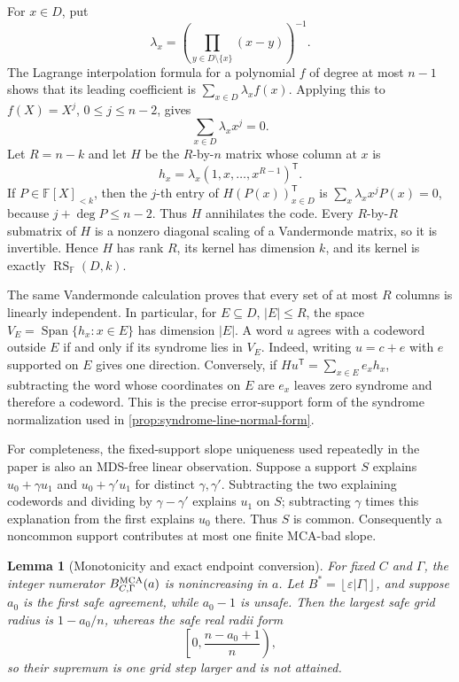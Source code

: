 \documentclass[11pt,a4paper]{amsart}
\numberwithin{equation}{section}
\newtheorem{lemma}[lemma]{Lemma}
\theoremstyle{remark}
\DeclareMathOperator{\RS}{RS}
\DeclareMathOperator{\Span}{Span}
\newcommand{\F}{\mathbb F}
\newcommand{\eps}{\varepsilon}
\newcommand{\floor}[1]{\left\lfloor #1\right\rfloor}
\begin{document}
For \(x\in D\), put
\[
 \lambda_x=\left(\prod_{y\in D\setminus\{x\}}(x-y)\right)^{-1}.
\]
The Lagrange interpolation formula for a polynomial \(f\) of degree at
most \(n-1\) shows that its leading coefficient is
\(\sum_{x\in D}\lambda_x f(x)\).  Applying this to
\(f(X)=X^j\), \(0\le j\le n-2\), gives
\[
                         \sum_{x\in D}\lambda_xx^j=0.
\]
Let \(R=n-k\) and let \(H\) be the \(R\)-by-\(n\) matrix whose column at
\(x\) is
\[
                    h_x=\lambda_x(1,x,\ldots,x^{R-1})^{\mathsf T}.
\]
If \(P\in\F[X]_{<k}\), then the \(j\)-th entry of
\(H(P(x))_{x\in D}^{\mathsf T}\) is
\(\sum_x\lambda_xx^jP(x)=0\), because \(j+\deg P\le n-2\).
Thus \(H\) annihilates the code.  Every \(R\)-by-\(R\) submatrix of
\(H\) is a nonzero diagonal scaling of a Vandermonde matrix, so it is
invertible.  Hence \(H\) has rank \(R\), its kernel has dimension \(k\),
and its kernel is exactly \(\RS_\F(D,k)\).

The same Vandermonde calculation proves that every set of at most \(R\)
columns is linearly independent.  In particular, for
\(E\subseteq D\), \(|E|\le R\), the space
\(V_E=\Span\{h_x:x\in E\}\) has dimension \(|E|\).  A word \(u\) agrees
with a codeword outside \(E\) if and only if its syndrome lies in \(V_E\).
Indeed, writing \(u=c+e\) with \(e\) supported on \(E\) gives one
direction.  Conversely, if
\(Hu^{\mathsf T}=\sum_{x\in E}e_xh_x\), subtracting the word whose
coordinates on \(E\) are \(e_x\) leaves zero syndrome and therefore a
codeword.  This is the precise error-support form of the syndrome
normalization used in \cref{prop:syndrome-line-normal-form}.

For completeness, the fixed-support slope uniqueness used repeatedly in
the paper is also an MDS-free linear observation.  Suppose a support
\(S\) explains \(u_0+\gamma u_1\) and \(u_0+\gamma' u_1\) for distinct
\(\gamma,\gamma'\).  Subtracting the two explaining codewords and dividing
by \(\gamma-\gamma'\) explains \(u_1\) on \(S\); subtracting
\(\gamma\) times this explanation from the first explains \(u_0\) there.
Thus \(S\) is common.  Consequently a noncommon support contributes at
most one finite MCA-bad slope.

\begin{lemma}[Monotonicity and exact endpoint conversion]
\label{lem:appendix-endpoint}
For fixed \(C\) and \(\Gamma\), the integer numerator
\(B_{C,\Gamma}^{\rm MCA}(a)\) is nonincreasing in \(a\).  Let
\(B^*=\floor{\eps|\Gamma|}\), and suppose \(a_0\) is the first safe
agreement, while \(a_0-1\) is unsafe.  Then the largest safe grid radius is
\(1-a_0/n\), whereas the safe real radii form
\[
                 \left[0,\frac{n-a_0+1}{n}\right),
\]
so their supremum is one grid step larger and is not attained.
\end{lemma}
\end{document}

